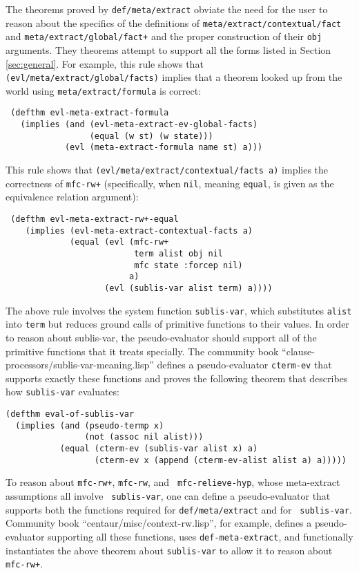The theorems proved by \texttt{def\-/meta\-/extract} obviate the need for the user to reason about
the specifics of the definitions of
\texttt{meta\-/extract\-/contextual\-/fact} and
\texttt{meta\-/extract\-/global\-/fact+} and the proper construction
of their \texttt{obj} arguments.  They theorems attempt to support
all the forms listed in Section \ref{sec:general}.  For example, this rule shows that
\texttt{(evl\-/meta\-/extract\-/global\-/facts)} implies that a theorem looked
up from the world using \texttt{meta\-/extract\-/formula} is correct:
\begin{verbatim}
 (defthm evl-meta-extract-formula
   (implies (and (evl-meta-extract-ev-global-facts)
                 (equal (w st) (w state)))
            (evl (meta-extract-formula name st) a)))

\end{verbatim}
This rule shows that
\texttt{(evl\-/meta\-/extract\-/contextual\-/facts a)} implies the correctness
of \texttt{mfc-rw+} (specifically, when \texttt{nil}, meaning
\texttt{equal}, is given as the equivalence relation argument):
\begin{verbatim}
 (defthm evl-meta-extract-rw+-equal
    (implies (evl-meta-extract-contextual-facts a)
             (equal (evl (mfc-rw+
                          term alist obj nil
                          mfc state :forcep nil)
                         a)
                    (evl (sublis-var alist term) a))))
\end{verbatim}
The above rule involves the system function {\tt sublis-var}, which
substitutes {\tt alist} into {\tt term} but reduces ground calls of
primitive functions to their values.  In order to reason about
sublis-var, the pseudo-evaluator should support all of the primitive
functions that it treats specially.  The community book
``clause-processors/sublis-var-meaning.lisp'' defines a
pseudo-evaluator {\tt cterm-ev} that supports exactly these functions
and proves the following theorem that describes how {\tt sublis-var} evaluates:
\begin{verbatim}
(defthm eval-of-sublis-var
  (implies (and (pseudo-termp x)
                (not (assoc nil alist)))
           (equal (cterm-ev (sublis-var alist x) a)
                  (cterm-ev x (append (cterm-ev-alist alist a) a)))))
\end{verbatim}

To reason about {\tt mfc-rw+}, {\tt mfc-rw}, and {\tt
  mfc-relieve-hyp}, whose meta-extract assumptions all involve {\tt
  sublis-var}, one can define a pseudo-evaluator that supports both
the functions required for \texttt{def\-/meta\-/extract} and for {\tt
  sublis-var}.  Community book ``centaur/misc/context-rw.lisp'', for
example, defines a pseudo-evaluator supporting all these functions,
uses {\tt def-meta-extract}, and functionally instantiates the above
theorem about {\tt sublis-var} to allow it to reason about {\tt
  mfc-rw+}.


